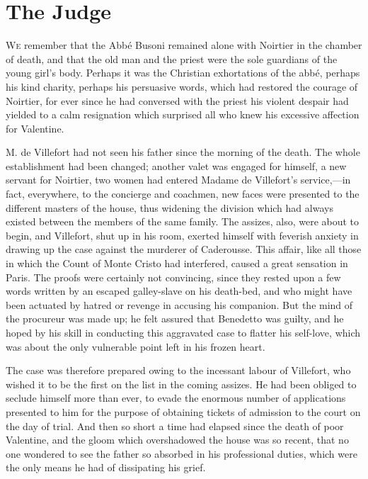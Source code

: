 \chapter{The Judge} 

 \lettrine{W}{e} remember that the Abbé Busoni remained alone with Noirtier in the chamber of death, and that the old man and the priest were the sole guardians of the young girl's body. Perhaps it was the Christian exhortations of the abbé, perhaps his kind charity, perhaps his persuasive words, which had restored the courage of Noirtier, for ever since he had conversed with the priest his violent despair had yielded to a calm resignation which surprised all who knew his excessive affection for Valentine. 

 M. de Villefort had not seen his father since the morning of the death. The whole establishment had been changed; another valet was engaged for himself, a new servant for Noirtier, two women had entered Madame de Villefort's service,—in fact, everywhere, to the concierge and coachmen, new faces were presented to the different masters of the house, thus widening the division which had always existed between the members of the same family. The assizes, also, were about to begin, and Villefort, shut up in his room, exerted himself with feverish anxiety in drawing up the case against the murderer of Caderousse. This affair, like all those in which the Count of Monte Cristo had interfered, caused a great sensation in Paris. The proofs were certainly not convincing, since they rested upon a few words written by an escaped galley-slave on his death-bed, and who might have been actuated by hatred or revenge in accusing his companion. But the mind of the procureur was made up; he felt assured that Benedetto was guilty, and he hoped by his skill in conducting this aggravated case to flatter his self-love, which was about the only vulnerable point left in his frozen heart. 

 The case was therefore prepared owing to the incessant labour of Villefort, who wished it to be the first on the list in the coming assizes. He had been obliged to seclude himself more than ever, to evade the enormous number of applications presented to him for the purpose of obtaining tickets of admission to the court on the day of trial. And then so short a time had elapsed since the death of poor Valentine, and the gloom which overshadowed the house was so recent, that no one wondered to see the father so absorbed in his professional duties, which were the only means he had of dissipating his grief. 

